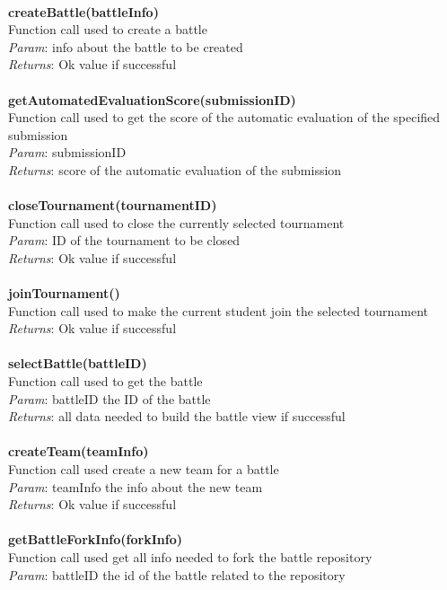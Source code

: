 \documentclass{article}
\begin{document}
\\
\textbf{createBattle(battleInfo)}\\
Function call used to create a battle\\
\textit{Param}: info about the battle to be created\\
\textit{Returns}: Ok value if successful\\
\\
\textbf{getAutomatedEvaluationScore(submissionID)}\\
Function call used to get the score of the automatic evaluation of the specified submission\\
\textit{Param}: submissionID\\
\textit{Returns}: score of the automatic evaluation of the submission\\
\\
\textbf{closeTournament(tournamentID)}\\
Function call used to close the currently selected tournament\\
\textit{Param}: ID of the tournament to be closed\\
\textit{Returns}: Ok value if successful\\
\\
\textbf{joinTournament()}\\
Function call used to make the current student join the selected tournament\\
\textit{Returns}: Ok value if successful\\
\\
\textbf{selectBattle(battleID)}\\
Function call used to get the battle\\
\textit{Param}: battleID the ID of the battle\\
\textit{Returns}: all data needed to build the battle view if successful\\
\\
\textbf{createTeam(teamInfo)}\\
Function call used create a new team for a battle\\
\textit{Param}: teamInfo the info about the new team\\
\textit{Returns}: Ok value if successful\\
\\
\textbf{getBattleForkInfo(forkInfo)}\\
Function call used get all info needed to fork the battle repository\\
\textit{Param}: battleID the id of the battle related to the repository\\
\end{document}
